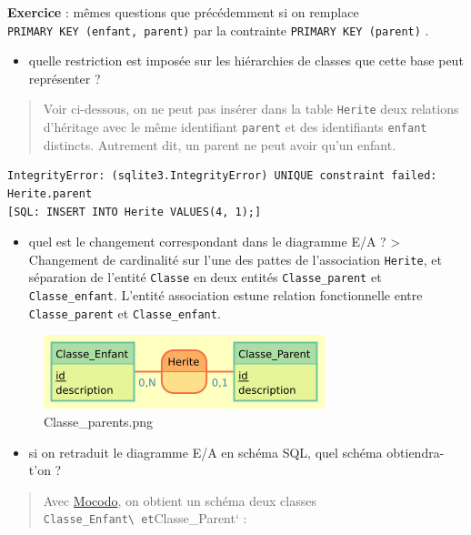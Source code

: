 \documentclass[11pt]{article}
\makeatletter
\def\maxwidth{\ifdim\Gin@nat@width>\linewidth\linewidth
    \else\Gin@nat@width\fi}
\let\Oldincludegraphics\includegraphics
\renewcommand{\includegraphics}[1]{\Oldincludegraphics[width=.8\maxwidth]{#1}}
\providecommand{\tightlist}{%
      \setlength{\itemsep}{0pt}\setlength{\parskip}{0pt}}
\makeatother
\begin{document}
    \textbf{Exercice} : mêmes questions que précédemment si on remplace
\texttt{PRIMARY\ KEY\ (enfant,\ parent)} par la contrainte
\texttt{PRIMARY\ KEY\ (parent)} .

\begin{itemize}
\tightlist
\item
  quelle restriction est imposée sur les hiérarchies de classes que
  cette base peut représenter ?
\end{itemize}

\begin{quote}
Voir ci-dessous, on ne peut pas insérer dans la table \texttt{Herite}
deux relations d'héritage avec le même identifiant \texttt{parent} et
des identifiants \texttt{enfant} distincts. Autrement dit, un parent ne
peut avoir qu'un enfant.
\end{quote}

\begin{verbatim}
IntegrityError: (sqlite3.IntegrityError) UNIQUE constraint failed: Herite.parent
[SQL: INSERT INTO Herite VALUES(4, 1);]
\end{verbatim}

\begin{itemize}
\tightlist
\item
  quel est le changement correspondant dans le diagramme E/A ?
  \textgreater{} Changement de cardinalité sur l'une des pattes de
  l'association \texttt{Herite}, et séparation de l'entité
  \texttt{Classe} en deux entités \texttt{Classe\_parent} et
  \texttt{Classe\_enfant}. L'entité association estune relation
  fonctionnelle entre \texttt{Classe\_parent} et
  \texttt{Classe\_enfant}.
\end{itemize}

\begin{figure}
\centering
\includegraphics{mocodo/Classe_enfants2/Classe_enfants2.png}
\caption{Classe\_parents.png}
\end{figure}

\begin{itemize}
\tightlist
\item
  si on retraduit le diagramme E/A en schéma SQL, quel schéma
  obtiendra-t'on ?
\end{itemize}

\begin{quote}
Avec \href{http://mocodo.wingi.net/}{Mocodo}, on obtient un schéma deux
classes \texttt{Classe\_Enfant\textbackslash{}\ et}Classe\_Parent` :
\end{quote}
\end{document}
